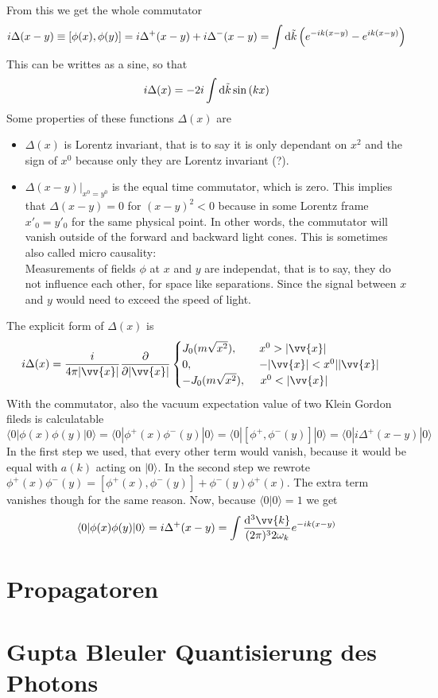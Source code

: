 \documentclass{include/thesisclass}
\newcommand{\rk}{\rangle}
\newcommand{\lk}{\langle}
\newcommand{\vx}{\vv{x}}
\newcommand{\dd}{{\rm d}}
\newcommand{\p}{\partial}
\begin{document}
From this we get the whole commutator
\[ i \Delta(x-y) \equiv [ \phi(x), \phi(y)] = i \Delta^+(x-y) + i \Delta^-(x-y) = \int \dd\tilde{k} \left( e^{-ik(x-y)} - e^{ik(x-y)}\right)\]
This can be writtes as a sine, so that
\[ i\Delta(x) = -2 i\int \dd\tilde{k} \sin\left( k x\right)\]
Some properties of these functions $\Delta(x)$ are
\begin{itemize}
\item $\Delta(x)$ is Lorentz invariant, that is to say it is only dependant on $x^2$ and the sign of $x^0$ because only they are Lorentz invariant (?).
\item $\Delta(x-y)|_{x^0 = y^0}$ is the equal time commutator, which is zero. This implies that $\Delta(x-y) = 0$ for $(x-y)^2 <0$ because in some Lorentz frame $x'_0 = y'_0$ for the same physical point. In other words, the commutator will vanish outside of the forward and backward light cones. This is sometimes also called micro causality:\\
Measurements of fields $\phi$ at $x$ and $y$ are independat, that is to say, they do not influence each other, for space like separations. Since the signal between $x$ and $y$ would need to exceed the speed of light.
\end{itemize}
The explicit form of $\Delta(x)$ is
\[ i \Delta(x) = \frac{i}{4 \pi | \vx|} \frac{\p}{\p | \vx|} \begin{cases}
J_0 (m \sqrt{x^2}), ~~~~~~ x^0 > |\vx|\\
0 ,~~~~~~~~~~~~~~~~~~ - | \vx| < x^0 | |\vx| \\
-J_0(m\sqrt{x^2}), ~~~~ x^0 < |\vx|
\end{cases}
\]
With the commutator, also the vacuum expectation value of two Klein Gordon fileds is calculatable
\[ \lk 0 | \phi(x) \phi(y) | 0 \rk = \lk 0 | \phi^+(x) \phi^-(y) | 0 \rk = \lk 0 | [\phi^+, \phi^-(y)] | 0\rk = \lk 0 | i \Delta^+(x-y) | 0  \rk \]
In the first step we used, that every other term would vanish, because it would be equal with $a(k)$ acting on $|0\rk$. In the second step we rewrote $\phi^+(x) \phi^-(y) = [\phi^+(x), \phi^-(y)] + \phi^-(y)\phi^+(x)$. The extra term vanishes though for the same reason. Now, because $\lk 0 | 0 \rk = 1$ we get
\[ \lk 0 | \phi(x) \phi(y) | 0 \rk = i \Delta^+ (x-y) = \int \frac{ \dd^3 \vv{k}}{(2\pi)^3 2 \omega_k} e^{-ik(x-y)}\]

\section{Propagatoren}
\section{Gupta Bleuler Quantisierung des Photons}
\end{document}
